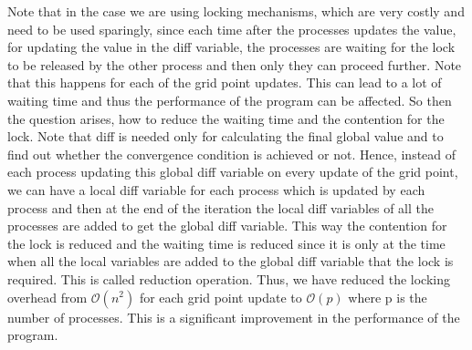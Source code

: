 \documentclass[12pt]{book}
\begin{document}
Note that in the case we are using locking mechanisms, which are very costly and need to be used sparingly,
since each time after the processes updates the value, for updating the value in the diff variable, the processes are waiting for the lock to be released by the other process and then only they can proceed further. 
Note that this happens for each of the grid point updates. 
This can lead to a lot of waiting time and thus the performance of the program can be affected.
So then the question arises, how to reduce the waiting time and the contention for the lock.
Note that diff is needed only for calculating the final global value and to find out whether the convergence condition is achieved or not.
Hence, instead of each process updating this global diff variable on every update of the grid point, we can have a local diff variable for each process which is updated by each process and then at the end of the iteration
the local diff variables of all the processes are added to get the global diff variable. This way the contention for the lock is reduced and the waiting time is reduced since it is only at the time when all the
local variables are added to the global diff variable that the lock is required. This is called reduction operation. Thus, we have reduced the locking overhead from $\mathcal{O}(n^2)$ for each grid point 
update to $\mathcal{O}(p)$ where p is the number of processes. This is a significant improvement in the performance of the program.
\end{document}
